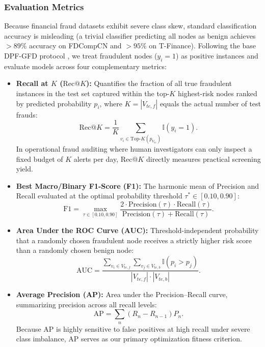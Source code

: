 \documentclass[10pt,a4paper,twocolumn]{article}
\begin{document}
\subsubsection{Evaluation Metrics}

Because financial fraud datasets exhibit severe class skew, standard classification accuracy is misleading (a trivial classifier predicting all nodes as benign achieves $> 89\%$ accuracy on FDCompCN and $> 95\%$ on T-Finance). Following the base DPF-GFD protocol \cite{ref9}, we treat fraudulent nodes ($y_i = 1$) as positive instances and evaluate models across four complementary metrics:

\begin{itemize}
  \item \textbf{Recall at $K$ ($\text{Rec}@K$):} Quantifies the fraction of all true fraudulent instances in the test set captured within the top-$K$ highest-risk nodes ranked by predicted probability $p_i$, where $K = |V_{te,f}|$ equals the actual number of test frauds:
  \begin{equation}
    \text{Rec}@K = \frac{1}{K} \sum_{v_i \in \text{Top-}K(p_{V_{te}})} \mathbb{I}(y_i = 1).
  \end{equation}
  In operational fraud auditing where human investigators can only inspect a fixed budget of $K$ alerts per day, $\text{Rec}@K$ directly measures practical screening yield.
  \item \textbf{Best Macro/Binary F1-Score (F1):} The harmonic mean of Precision and Recall evaluated at the optimal probability threshold $\tau^* \in [0.10, 0.90]$:
  \begin{equation}
    \text{F1} = \max_{\tau \in [0.10, 0.90]} \frac{2 \cdot \text{Precision}(\tau) \cdot \text{Recall}(\tau)}{\text{Precision}(\tau) + \text{Recall}(\tau)}.
  \end{equation}
  \item \textbf{Area Under the ROC Curve (AUC):} Threshold-independent probability that a randomly chosen fraudulent node receives a strictly higher risk score than a randomly chosen benign node:
  \begin{equation}
    \text{AUC} = \frac{\sum_{v_i \in V_{te,f}} \sum_{v_j \in V_{te,b}} \mathbb{I}(p_i > p_j)}{|V_{te,f}| \cdot |V_{te,b}|}.
  \end{equation}
  \item \textbf{Average Precision (AP):} Area under the Precision--Recall curve, summarizing precision across all recall levels:
  \begin{equation}
    \text{AP} = \sum_n (R_n - R_{n-1}) P_n.
  \end{equation}
  Because AP is highly sensitive to false positives at high recall under severe class imbalance, AP serves as our primary optimization fitness criterion.
\end{itemize}
\end{document}
